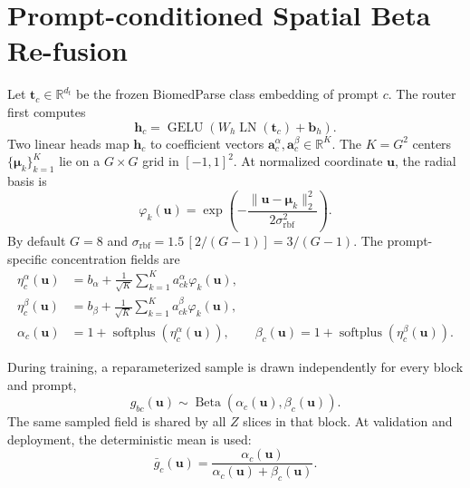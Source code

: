 \documentclass[10pt]{article}
\newcommand{\R}{\mathbb{R}}
\newcommand{\softplus}{\operatorname{softplus}}
\begin{document}
\section{Prompt-conditioned Spatial Beta Re-fusion}


Let $\bm{t}_c\in\R^{d_t}$ be the frozen BiomedParse class embedding of prompt
$c$.  The router first computes
\begin{equation}
    \bm{h}_c
    =\operatorname{GELU}\!\left(
       W_h\operatorname{LN}(\bm{t}_c)+\bm{b}_h
     \right).
\end{equation}
Two linear heads map $\bm{h}_c$ to coefficient vectors
$\bm{a}^{\alpha}_c,\bm{a}^{\beta}_c\in\R^K$.  The $K=G^2$ centers
$\{\bm{\mu}_k\}_{k=1}^{K}$ lie on a $G\times G$ grid in $[-1,1]^2$.  At
normalized coordinate $\bm{u}$, the radial basis is
\begin{equation}
    \varphi_k(\bm{u})
    =\exp\!\left(
      -\frac{\|\bm{u}-\bm{\mu}_k\|_2^2}{2\sigma_{\mathrm{rbf}}^2}
      \right).
\end{equation}
By default $G=8$ and
$\sigma_{\mathrm{rbf}}=1.5\,[2/(G-1)]=3/(G-1)$.
The prompt-specific concentration fields are
\begin{align}
    \eta_c^{\alpha}(\bm{u})
      &=b_{\alpha}+\frac{1}{\sqrt K}
        \sum_{k=1}^{K}a^{\alpha}_{ck}\varphi_k(\bm{u}),\\
    \eta_c^{\beta}(\bm{u})
      &=b_{\beta}+\frac{1}{\sqrt K}
        \sum_{k=1}^{K}a^{\beta}_{ck}\varphi_k(\bm{u}),\\
    \alpha_c(\bm{u})&=1+\softplus(\eta_c^{\alpha}(\bm{u})),\qquad
    \beta_c(\bm{u})=1+\softplus(\eta_c^{\beta}(\bm{u})).
    \label{eq:beta-field}
\end{align}

During training, a reparameterized sample is drawn independently for every
block and prompt,
\begin{equation}
    g_{bc}(\bm{u})\sim
    \operatorname{Beta}(\alpha_c(\bm{u}),\beta_c(\bm{u})).
\end{equation}
The same sampled field is shared by all $Z$ slices in that block.  At validation
and deployment, the deterministic mean is used:
\begin{equation}
    \bar g_c(\bm{u})
    =\frac{\alpha_c(\bm{u})}
           {\alpha_c(\bm{u})+\beta_c(\bm{u})}.
    \label{eq:beta-mean}
\end{equation}
\end{document}
